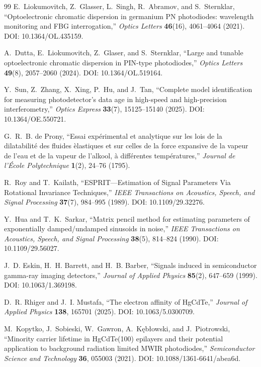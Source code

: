\documentclass[11pt]{article}
\begin{document}
\begin{thebibliography}{99}
E.~Liokumovitch, Z.~Glasser, L.~Singh, R.~Abramov, and S.~Sternklar, ``Optoelectronic chromatic dispersion in germanium PN photodiodes: wavelength monitoring and FBG interrogation,'' \emph{Optics Letters} \textbf{46}(16), 4061--4064 (2021). DOI: 10.1364/OL.435159.

A.~Dutta, E.~Liokumovitch, Z.~Glaser, and S.~Sternklar, ``Large and tunable optoelectronic chromatic dispersion in PIN-type photodiodes,'' \emph{Optics Letters} \textbf{49}(8), 2057--2060 (2024). DOI: 10.1364/OL.519164.

Y.~Sun, Z.~Zhang, X.~Xing, P.~Hu, and J.~Tan, ``Complete model identification for measuring photodetector's data age in high-speed and high-precision interferometry,'' \emph{Optics Express} \textbf{33}(7), 15125--15140 (2025). DOI: 10.1364/OE.550721.


G.~R.~B. de Prony, ``Essai exp\'erimental et analytique sur les lois de la dilatabilit\'e des fluides \`elastiques et sur celles de la force expansive de la vapeur de l'eau et de la vapeur de l'alkool, \`a diff\'erentes temp\'eratures,'' \emph{Journal de l'\'Ecole Polytechnique} \textbf{1}(2), 24--76 (1795).

R.~Roy and T.~Kailath, ``ESPRIT---Estimation of Signal Parameters Via Rotational Invariance Techniques,'' \emph{IEEE Transactions on Acoustics, Speech, and Signal Processing} \textbf{37}(7), 984--995 (1989). DOI: 10.1109/29.32276.

Y.~Hua and T.~K.~Sarkar, ``Matrix pencil method for estimating parameters of exponentially damped/undamped sinusoids in noise,'' \emph{IEEE Transactions on Acoustics, Speech, and Signal Processing} \textbf{38}(5), 814--824 (1990). DOI: 10.1109/29.56027.

J.~D. Eskin, H.~H. Barrett, and H.~B. Barber, ``Signals induced in semiconductor gamma-ray imaging detectors,'' \emph{Journal of Applied Physics} \textbf{85}(2), 647--659 (1999). DOI: 10.1063/1.369198.

D.~R. Rhiger and J.~I. Mustafa, ``The electron affinity of HgCdTe,'' \emph{Journal of Applied Physics} \textbf{138}, 165701 (2025). DOI: 10.1063/5.0300709.

M.~Kopytko, J.~Sobieski, W.~Gawron, A.~K\k{e}b\l{}owski, and J.~Piotrowski, ``Minority carrier lifetime in HgCdTe(100) epilayers and their potential application to background radiation limited MWIR photodiodes,'' \emph{Semiconductor Science and Technology} \textbf{36}, 055003 (2021). DOI: 10.1088/1361-6641/abea6d.


\end{thebibliography}
\end{document}
